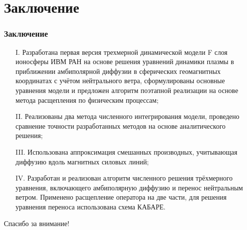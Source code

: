 \documentclass[9pt, apectratio=43,unicode]{beamer}
\begin{document}
\section{Заключение}

\begin{frame}\frametitle{Заключение}
\begin{itemize}
\item[I.] Разработана первая версия трехмерной динамической модели F слоя ионосферы ИВМ РАН на основе решения уравнений динамики плазмы в приближении амбиполярной диффузии в сферических геомагнитных координатах с учётом нейтрального ветра, сформулированы основные уравнения модели и предложен алгоритм поэтапной реализации на основе метода расщепления по физическим процессам;
\item[II.] Реализованы два метода численного интегрирования модели, проведено сравнение точности разработанных методов на основе аналитического решения;
\item[III.] Использована аппроксимация смешанных производных, учитывающая диффузию вдоль магнитных силовых линий;
\item[IV.] Разработан и реализован алгоритм численного решения трёхмерного уравнения, включающего амбиполярную диффузию и перенос нейтральным ветром. Применено расщепление оператора на две части, для решения уравнения переноса использована схема КАБАРЕ.
\end{itemize}
\end{frame}


\begin{frame}[plain]
  \begin{center}
  {\Huge Спасибо за внимание!}
  \end{center}
\end{frame}
\end{document}
